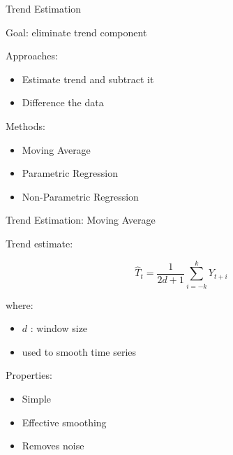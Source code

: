\documentclass[aspectratio=169]{beamer}
\begin{document}
\begin{frame}{Trend Estimation}

Goal: eliminate trend component

Approaches:

\begin{itemize}

\item Estimate trend and subtract it

\item Difference the data

\end{itemize}

Methods:

\begin{itemize}

\item Moving Average

\item Parametric Regression

\item Non-Parametric Regression

\end{itemize}

\end{frame}

\begin{frame}{Trend Estimation: Moving Average}

Trend estimate:

\[
\hat{T}_t =
\frac{1}{2d +1}
\sum_{i=-k}^{k} Y_{t+i}
\]

where:

\begin{itemize}

\item $d$ : window size

\item used to smooth time series

\end{itemize}

Properties:

\begin{itemize}

\item Simple

\item Effective smoothing

\item Removes noise

\end{itemize}
\end{frame}
\end{document}
